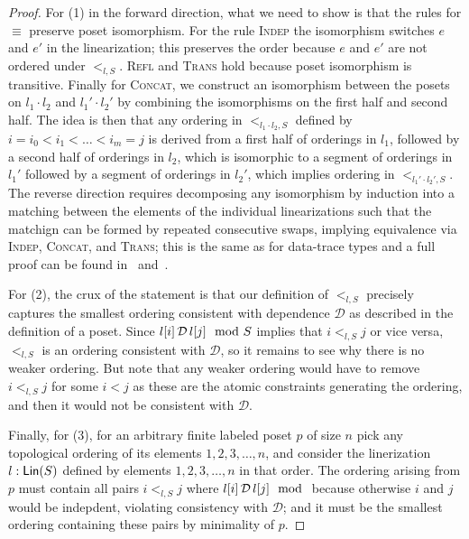 \begin{proof}
For (1) in the forward direction, what we need to show is that the rules for $\equiv$ preserve poset isomorphism. For the rule \textsc{Indep} the isomorphism switches $e$ and $e'$ in the linearization; this preserves the order because $e$ and $e'$ are not ordered under $<_{l, S}$. \textsc{Refl} and \textsc{Trans} hold because poset isomorphism is transitive. Finally for \textsc{Concat}, we construct an isomorphism between the posets on $l_1 \cdot l_2$ and $l_1' \cdot l_2'$ by combining the isomorphisms on the first half and second half. The idea is then that any ordering in $<_{l_1 \cdot l_2, S}$ defined by $i = i_0 < i_1 < \ldots < i_m = j$ is derived from a first half of orderings in $l_1$, followed by a second half of orderings in $l_2$,
which is isomorphic to a segment of orderings in $l_1'$ followed by a segment of orderings in $l_2'$, which implies ordering in $<_{l_1' \cdot l_2', S}$.
The reverse direction requires decomposing any isomorphism by induction into a matching between the elements of the individual linearizations such that the matchign can be formed by repeated consecutive swaps, implying equivalence via \textsc{Indep}, \textsc{Concat}, and \textsc{Trans}; this is the same as for data-trace types and a full proof can be found in~ and~.

For (2), the crux of the statement is that our definition of $<_{l, S}$ precisely captures the smallest ordering consistent with dependence $\mathcal{D}$ as described in the definition of a poset. Since $l[i] \,\mathcal{D}\, l[j] \mod {S}$ implies that $i <_{l, S} j$ or vice versa, $<_{l, S}$ is an ordering consistent with $\mathcal{D}$, so it remains to see why there is no weaker ordering. But note that any weaker ordering would have to remove $i <_{l, S} j$ for some $i < j$ as these are the atomic constraints generating the ordering, and then it would not be consistent with $\mathcal{D}$.

Finally, for (3), for an arbitrary finite labeled poset $p$ of size $n$ pick any topological ordering of its elements $1, 2, 3, \ldots, n$, and consider the linerization $l: \mathsf{Lin}({S})$ defined by elements $1, 2, 3, \ldots, n$ in that order. The ordering arising from $p$ must contain all pairs $i <_{l, S} j$ where $\deptype{l[i]}{l[j]}$ because otherwise $i$ and $j$ would be indepdent, violating consistency with $\mathcal{D}$; and it must be the smallest ordering containing these pairs by minimality of $p$.
\end{proof}

